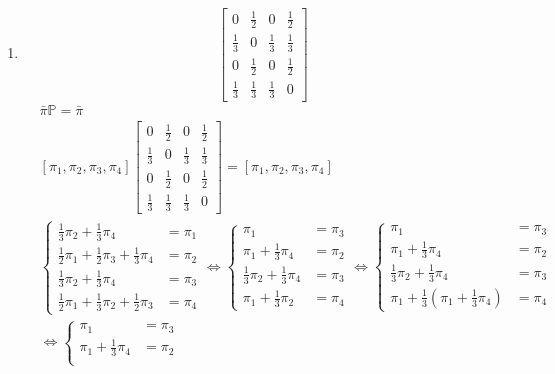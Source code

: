 \documentclass[a4paper,12pt]{article}
\theoremstyle{definition}%
\theoremstyle{definition}
\theoremstyle{problem}
\begin{document}
\begin{enumerate}[label=\alph*)]
\item 
$$\begin{bmatrix}
0&\frac{1}{2}&0&\frac{1}{2}\\
\frac{1}{3}&0&\frac{1}{3}&\frac{1}{3}\\
0&\frac{1}{2}&0&\frac{1}{2}\\
\frac{1}{3}&\frac{1}{3}&\frac{1}{3}&0
\end{bmatrix}$$
\begin{align*}
&\bar{\pi}\mathbb{P}=\bar{\pi}\\
&\left[\pi _1, \pi _2,\pi _3,\pi _4\right]\begin{bmatrix}
0&\frac{1}{2}&0&\frac{1}{2}\\
\frac{1}{3}&0&\frac{1}{3}&\frac{1}{3}\\
0&\frac{1}{2}&0&\frac{1}{2}\\
\frac{1}{3}&\frac{1}{3}&\frac{1}{3}&0
\end{bmatrix} = \left[\pi _1, \pi _2,\pi _3,\pi _4\right]\\
& \left\{\begin{matrix}
\frac{1}{3} \pi _2 + \frac{1}{3} \pi _4 &= \pi _1\\
\frac{1}{2} \pi _1 + \frac{1}{2} \pi _3 + \frac{1}{3} \pi _4 &= \pi _2\\
\frac{1}{3} \pi _2 + \frac{1}{3} \pi _4 &= \pi _3\\
\frac{1}{2} \pi _1 + \frac{1}{3} \pi _2 + \frac{1}{2} \pi _3 &= \pi _4
\end{matrix}\right. \Leftrightarrow \left\{\begin{matrix}
\pi _1  &= \pi _3\\
\pi _1 + \frac{1}{3} \pi _4 &= \pi _2\\
\frac{1}{3} \pi _2 + \frac{1}{3} \pi _4 &= \pi _3\\
\pi _1 + \frac{1}{3} \pi _2 &= \pi _4
\end{matrix}\right.\Leftrightarrow \left\{\begin{matrix}
\pi _1  &= \pi _3\\
\pi _1 + \frac{1}{3} \pi _4 &= \pi _2\\
\frac{1}{3} \pi _2 + \frac{1}{3} \pi _4 &= \pi _3\\
\pi _1 + \frac{1}{3}\left(\pi _1 + \frac{1}{3} \pi _4\right) &= \pi _4
\end{matrix}\right.\\
& \Leftrightarrow \left\{\begin{matrix}
\pi _1  &= \pi _3\\
\pi _1 + \frac{1}{3} \pi _4 &= \pi _2\\

\end{matrix}
\end{align*}
\end{enumerate}
\end{document}
